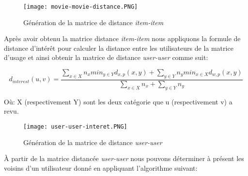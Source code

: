 \begin{figure}[H]
	\centering
	\texttt{[image: movie-movie-distance.PNG]}
	\caption{Génération de la matrice de distance\textit{ item-item}}
\end{figure}

Après avoir obtenu la matrice distance\textit{ item-item} nous appliquons la formule de distance d'intérêt pour calculer la distance entre les utilisateurs de la matrice d'usage et ainsi obtenir la matrice de distance \textit{user-user} comme suit: 



\begin{equation}
d_{interest}(u,v) = \frac{\sum _{x \in X}n_{x} min_{y \in Y} d_{x,p} (x,y) + \sum_{y \in Y} n_{y} min_{x \in X} d_{w,p} (x,y)} {\sum _{x \in X} n_{x} + \sum _{y \in Y} n_{y}}
\end{equation}

Où: X (respectivement Y) sont les deux catégorie que u (respectivement v) a revu.



\begin{figure}[H]
	\centering
	\texttt{[image: user-user-interet.PNG]}
	\caption{Génération de la matrice de distance \textit{user-user}}
\end{figure}

À partir de la matrice distancée \textit{user-user} nous pouvons déterminer à présent les voisins d'un utilisateur donné en appliquant l'algorithme suivant:

